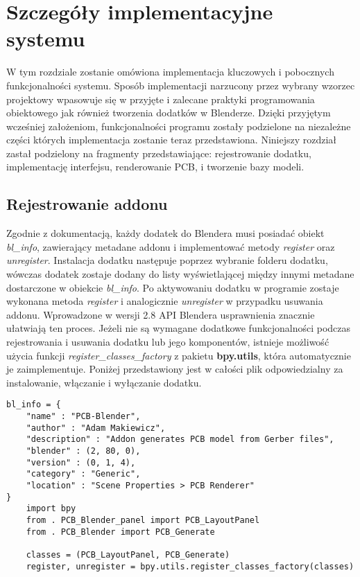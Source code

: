 \documentclass{xmgr}
\begin{document}
\chapter{Szczegóły implementacyjne systemu}
W tym rozdziale zostanie omówiona implementacja kluczowych i pobocznych funkcjonalności systemu. Sposób implementacji narzucony przez wybrany wzorzec projektowy wpasowuje się w przyjęte i zalecane praktyki programowania obiektowego jak również tworzenia dodatków w Blenderze. Dzięki przyjętym wcześniej założeniom, funkcjonalności programu zostały podzielone na niezależne części których implementacja zostanie teraz przedstawiona. Niniejszy rozdział zastał podzielony na fragmenty przedstawiające: rejestrowanie dodatku, implementację interfejsu, renderowanie PCB, i tworzenie bazy modeli.


\section {Rejestrowanie addonu}
Zgodnie z dokumentacją, każdy dodatek do Blendera musi posiadać obiekt \emph{bl\_info}, zawierający metadane addonu i implementować metody \emph{register} oraz \emph{unregister}. Instalacja dodatku następuje poprzez wybranie folderu dodatku, wówczas dodatek zostaje dodany do listy wyświetlającej między innymi metadane dostarczone w obiekcie \emph{bl\_info}. Po aktywowaniu dodatku w programie zostaje wykonana metoda \emph{register} i analogicznie \emph{unregister} w przypadku usuwania addonu. Wprowadzone w wersji 2.8 API Blendera usprawnienia znacznie ułatwiają ten proces. Jeżeli nie są wymagane dodatkowe funkcjonalności podczas rejestrowania i usuwania dodatku lub jego komponentów, istnieje możliwość użycia funkcji \emph{register\_classes\_factory} z pakietu \textbf{bpy.utils}, która automatycznie je zaimplementuje. Poniżej przedstawiony jest w całości plik odpowiedzialny za instalowanie, włączanie i wyłączanie dodatku.
\newpage
{}
\begin{lstlisting}
bl_info = {
	"name" : "PCB-Blender",
	"author" : "Adam Makiewicz",
	"description" : "Addon generates PCB model from Gerber files",
	"blender" : (2, 80, 0),
	"version" : (0, 1, 4),
	"category" : "Generic",
	"location" : "Scene Properties > PCB Renderer"
}
	import bpy
	from . PCB_Blender_panel import PCB_LayoutPanel
	from . PCB_Blender import PCB_Generate

	classes = (PCB_LayoutPanel, PCB_Generate)
	register, unregister = bpy.utils.register_classes_factory(classes)
\end{lstlisting}
\end{document}
